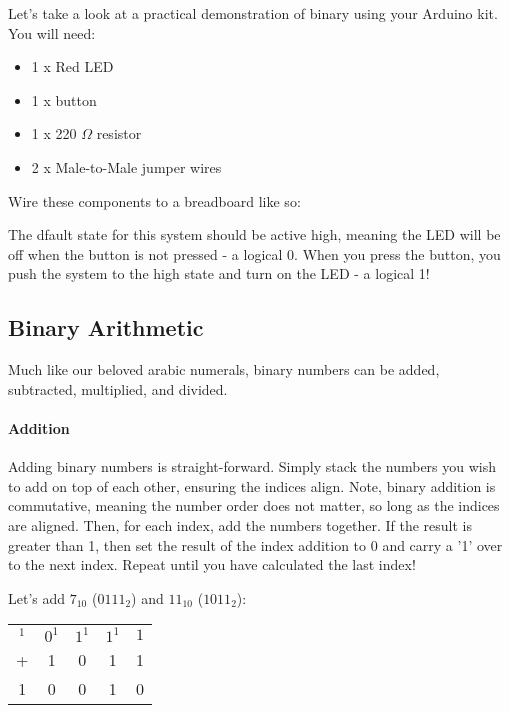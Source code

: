 \begin{example}
    Let's take a look at a practical demonstration of binary using your Arduino kit.
    You will need:
    \begin{itemize}
        \item 1 x Red LED
        \item 1 x button
        \item 1 x 220 $\Omega$ resistor
        \item 2 x Male-to-Male jumper wires
    \end{itemize}

    Wire these components to a breadboard like so:
        

    The dfault state for this system should be active high, meaning the LED will be off when the button is not pressed - a logical 0.
    When you press the button, you push the system to the high state and turn on the LED - a logical 1!
\end{example}


    \subsection{Binary Arithmetic}
    Much like our beloved arabic numerals, binary numbers can be added, subtracted, multiplied, and divided.

    \paragraph*{Addition} Adding binary numbers is straight-forward.
    Simply stack the numbers you wish to add on top of each other, ensuring the indices align.
    Note, binary addition is commutative, meaning the number order does not matter, so long as the indices are aligned.
    Then, for each index, add the numbers together.
    If the result is greater than 1, then set the result of the index addition to 0 and carry a '1' over to the next index.
    Repeat until you have calculated the last index!

    \begin{example}
        Let's add $7_{10}$ ($0111_2$) and $11_{10}$ ($1011_2$):
        \begin{center}
            \begin{tabular}{ccccc}
                $^1$  & $0^1$ & $1^1$ & $1^1$ & $1$ \\
                +     & 1     & 0     & 1     & 1 \\
                \hline
                1     & 0     & 0     & 1     & 0 \\
            \end{tabular}
        \end{center}
    \end{example}

